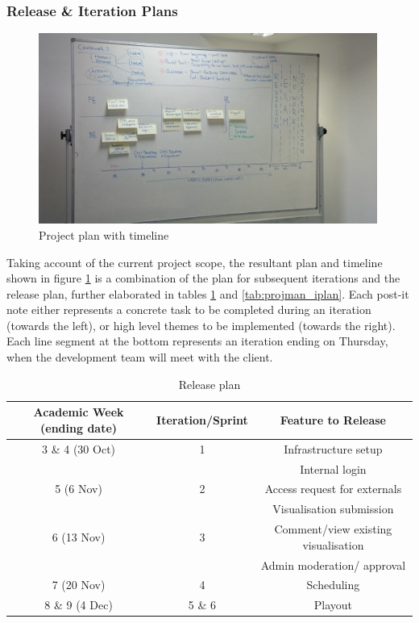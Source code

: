 \documentclass[a4paper, titlepage]{article}
\begin{document}
\subsubsection{Release \& Iteration Plans}

\begin{figure}[h!]
  \centering
    \includegraphics[width = 0.99\textwidth, trim = 0 3.8cm 0 0.8cm, clip]{./projman/timeline.jpg}
  \caption{Project plan with timeline}
  \label{fig:projman_timeline}
\end{figure}


Taking account of the current project scope, the resultant plan and timeline shown in figure 
\ref{fig:projman_timeline} is a
combination of the plan for subsequent iterations and the release plan, further elaborated in tables 
\ref{tab:projman_rplan} and \ref{tab:projman_iplan}. Each post-it note either represents a 
concrete task to be completed during an iteration (towards the left), or
high level themes to be implemented (towards the right). Each line segment at
the bottom represents an iteration ending on Thursday, when the development
team will meet with the client.

\begin{table}[h!]
  \begin{center}
  \begin{tabular}{c | c | c}
     \textbf{Academic Week (ending date)} & \textbf{Iteration/Sprint} & \textbf{Feature to Release} \\ \hline
     3 \& 4 (30 Oct) & 1 & Infrastructure setup \\
      & & Internal login \\
     5 (6 Nov) & 2 & Access request for externals \\
      & & Visualisation submission \\
     6 (13 Nov) & 3 & Comment/view existing visualisation \\
      & & Admin moderation/ approval \\
     7 (20 Nov) & 4 & Scheduling \\
     8 \& 9 (4 Dec) & 5 \& 6 & Playout \\
  \end{tabular}
  \end{center}
  \caption{Release plan}
  \label{tab:projman_rplan}
\end{table}
\end{document}
